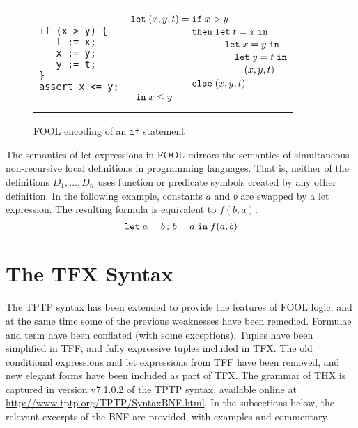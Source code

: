 \documentclass{easychair}
\begin{document}
\begin{figure}[htbp]
\begin{center}
\begin{tabular}[t]{ll}
\begin{minipage}{0.3\textwidth}
\begin{verbatim}
if (x > y) {
   t := x;
   x := y;
   y := t;
}
assert x <= y;
\end{verbatim}
\end{minipage}
&
\begin{minipage}{0.3\textwidth}
\[
  \letnl{(x,y,t)}{\itenll{x > y}
                 {\letinnl{t}{x}
                          {\letinnl{x}{y}
                                   {\letinnl{y}{t}
                                            {(x,y,t)}}}}
                 {(x,y,t)}}
        {x \le y}
\]
\end{minipage}
\\
\end{tabular}
\end{center}
\caption{FOOL encoding of an {\tt if} statement}
\label{fig:simple-if}
\end{figure}

The semantics of let expressions in FOOL mirrors the semantics of
simultaneous non-recursive local definitions in programming languages. That is,
neither of the definitions $D_1,\ldots,\allowbreak D_n$ uses function or
predicate symbols created by any other definition. In the following example,
constants $a$ and $b$ are swapped by a let expression. The resulting formula
is equivalent to $f(b, a)$.
\begin{equation}\label{eq:parallel-let-example}
\mathtt{let}\;{a}={b}\,;\,{b}={a}\;\mathtt{in}\;f(a, b)
\end{equation}

\section{The TFX Syntax}
\label{TFX}

The TPTP syntax has been extended to provide the features of FOOL logic,
and at the same time some of the previous weaknesses have been remedied.
Formulae and term have been conflated (with some exceptions).
Tuples have been simplified in TFF, and fully expressive tuples included in 
TFX. 
The old conditional expressions and let expressions from TFF have been 
removed, and new elegant forms have been included as part of TFX. 
The grammar of THX is captured in version v7.1.0.2 of the TPTP syntax,
available online at \url{http://www.tptp.org/TPTP/SyntaxBNF.html}.
In the subsections below, the relevant excerpts of the BNF are provided,
with examples and commentary.
\end{document}
